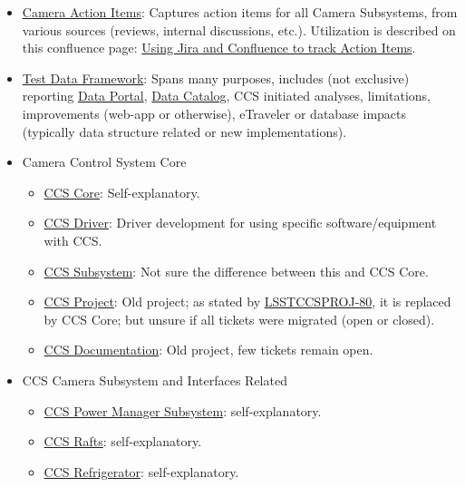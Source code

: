 \begin{itemize}
	\item \href{https://jira.slac.stanford.edu/browse/LCAI}{Camera Action Items}: Captures action items for all Camera Subsystems, from various sources (reviews, internal discussions, etc.). Utilization is described on this confluence page: \href{https://confluence.slac.stanford.edu/pages/viewpage.action?pageId=130884357}{Using Jira and Confluence to track Action Items}.
	\item \href{https://jira.slac.stanford.edu/browse/LSSTTD}{Test Data Framework}:  Spans many purposes, includes (not exclusive) reporting \href{http://lsst-camera.slac.stanford.edu/DataPortal/}{Data Portal}, \href{http://srs.slac.stanford.edu/DataCatalog/?experiment=LSST-CAMERA}{Data Catalog}, CCS initiated analyses, limitations, improvements (web-app or otherwise), eTraveler or database impacts (typically data structure related or new implementations).
	\item Camera Control System Core
	\begin{itemize}
		\item \href{https://jira.slac.stanford.edu/browse/LSSTCCS}{CCS Core}:  Self-explanatory.
		\item \href{https://jira.slac.stanford.edu/browse/LSSTCCSDRIVER}{CCS Driver}:  Driver development for using specific software/equipment with CCS.
		\item \href{https://jira.slac.stanford.edu/browse/LSSTCCSSUB}{CCS Subsystem}:   Not sure the difference between this and CCS Core.
		\item \href{https://jira.slac.stanford.edu/browse/LSSTCCSPROJ}{CCS Project}:  Old project; as stated by \href{https://jira.slac.stanford.edu/browse/LSSTCCSPROJ-80}{LSSTCCSPROJ-80}, it is replaced by CCS Core; but unsure if all tickets were migrated (open or closed).
		\item \href{https://jira.slac.stanford.edu/browse/LSSTCCSDOC}{CCS Documentation}:  Old project, few tickets remain open.
	\end{itemize}
	\item CCS Camera Subsystem and Interfaces Related
		\begin{itemize}
		\item \href{https://jira.slac.stanford.edu/browse/LSSTCCSPOWER}{CCS Power Manager Subsystem}:  self-explanatory.
		\item \href{https://jira.slac.stanford.edu/browse/LSSTCCSRAFTS}{CCS Rafts}:  self-explanatory.
		\item \href{https://jira.slac.stanford.edu/browse/LSSTCCSREFRIG}{CCS Refrigerator}:  self-explanatory.

\end{itemize}
\end{itemize}

